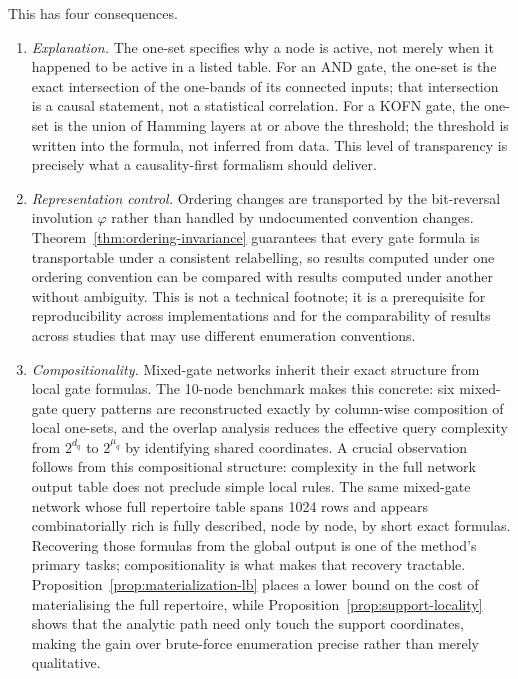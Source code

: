 \documentclass[11pt]{article}
\theoremstyle{definition}
\begin{document}
This has four consequences.
\begin{enumerate}[label=\arabic*.]
\item \emph{Explanation.} The one-set specifies why a node is active, not merely when it happened to be active in a listed table. For an AND gate, the one-set is the exact intersection of the one-bands of its connected inputs; that intersection is a causal statement, not a statistical correlation. For a KOFN gate, the one-set is the union of Hamming layers at or above the threshold; the threshold is written into the formula, not inferred from data. This level of transparency is precisely what a causality-first formalism should deliver.

\item \emph{Representation control.} Ordering changes are transported by the bit-reversal involution \(\varphi\) rather than handled by undocumented convention changes. Theorem~\ref{thm:ordering-invariance} guarantees that every gate formula is transportable under a consistent relabelling, so results computed under one ordering convention can be compared with results computed under another without ambiguity. This is not a technical footnote; it is a prerequisite for reproducibility across implementations and for the comparability of results across studies that may use different enumeration conventions.

\item \emph{Compositionality.} Mixed-gate networks inherit their exact structure from local gate formulas. The 10-node benchmark makes this concrete: six mixed-gate query patterns are reconstructed exactly by column-wise composition of local one-sets, and the overlap analysis reduces the effective query complexity from \(2^{d_q}\) to \(2^{\mu_q}\) by identifying shared coordinates. A crucial observation follows from this compositional structure: complexity in the full network output table does not preclude simple local rules. The same mixed-gate network whose full repertoire table spans 1024 rows and appears combinatorially rich is fully described, node by node, by short exact formulas. Recovering those formulas from the global output is one of the method's primary tasks; compositionality is what makes that recovery tractable. Proposition~\ref{prop:materialization-lb} places a lower bound on the cost of materialising the full repertoire, while Proposition~\ref{prop:support-locality} shows that the analytic path need only touch the support coordinates, making the gain over brute-force enumeration precise rather than merely qualitative.


\end{enumerate}
\end{document}
